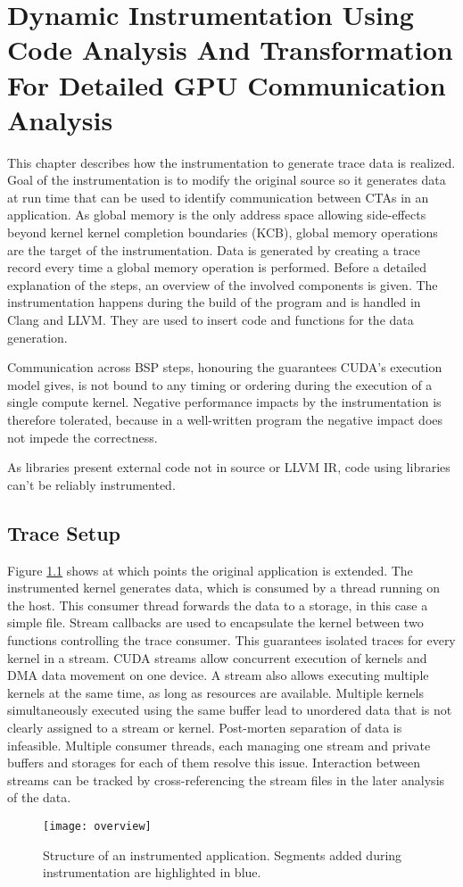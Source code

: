 \chapter{Dynamic Instrumentation Using Code Analysis And Transformation For Detailed GPU Communication Analysis}\label{chap:impl}
This chapter describes how the instrumentation to generate trace data is realized. Goal of the instrumentation is to modify the original source so it generates data at run time that can be used to identify communication between CTAs in an application. As global memory is the only address space allowing side-effects beyond kernel kernel completion boundaries (KCB), global memory operations are the target of the instrumentation. Data is generated by creating a trace record every time a global memory operation is performed.  Before a detailed explanation of the steps, an overview of the involved components is given. The instrumentation happens during the build of the program and is handled in Clang and LLVM. They are used to insert code and functions for the data generation.

Communication across BSP steps, honouring the guarantees CUDA's execution model gives, is not bound to any timing or ordering during the execution of a single compute kernel. Negative performance impacts by the instrumentation is therefore tolerated, 
because in a well-written program the negative impact does not impede the correctness.

As libraries present external code not in source or LLVM IR, code using libraries can't be reliably instrumented.

\section{Trace Setup}
Figure \ref{overview} shows at which points the original application is extended. The instrumented kernel generates data, which is consumed by a thread running on the host. This consumer thread forwards the data to a 
storage, in this case a simple file. Stream callbacks are used to encapsulate the kernel
between two functions controlling the trace consumer. This guarantees isolated traces for every kernel in a stream.
CUDA streams allow concurrent execution of kernels and DMA data movement on one device.
A stream also allows executing multiple kernels at the same time, as long as resources are available. Multiple kernels simultaneously executed using the same buffer lead to unordered data that is not clearly assigned to a stream or kernel. Post-morten separation of data is infeasible. Multiple consumer threads, each managing one stream and private buffers and storages for each of them resolve this issue. Interaction between streams can be tracked by cross-referencing the stream files in the later analysis of the data.
\begin{figure}[t]
	\centering
	\texttt{[image: overview]}
	\caption{Structure of an instrumented application. Segments added during instrumentation are highlighted in blue.}
	\label{overview}
\end{figure}


